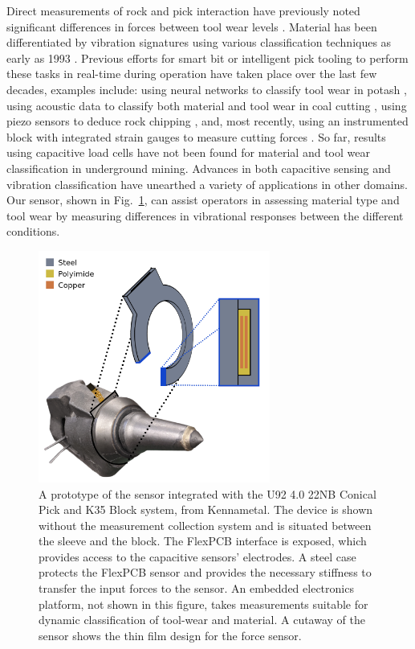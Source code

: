 Direct measurements of rock and pick interaction have previously noted 
 significant differences in forces between tool wear levels \cite{sundae85, donna90}.
Material has been differentiated by vibration signatures using various classification techniques
 as early as 1993 \cite{gary93}.
Previous efforts for smart bit or intelligent pick tooling to perform these tasks in real-time during operation 
 have taken place over the last few decades, examples include:
 using neural networks to classify tool wear in potash \cite{potashMeyersThesis}, 
 using acoustic data to classify both material and tool wear in coal cutting \cite{shen1996acoustic}, 
 using piezo sensors to deduce rock chipping \cite{smartbitMillerThesis},
 and, most recently, using an instrumented block with integrated strain gauges to measure cutting forces \cite{fries21}.
So far, results using capacitive load cells have not been found for 
 material and tool wear classification in underground mining. 
Advances in both capacitive sensing and vibration classification 
 have unearthed a variety of applications in other domains.
Our sensor, shown in Fig.~\ref{fig:senseonpick}, can assist operators in assessing material type and tool wear
 by measuring differences in vibrational responses between the different conditions.


\begin{figure}[t!]
\centering
\includegraphics[width=3in]{figures/p1_media/Fig1.png}
\caption{A prototype of the sensor integrated with the U92 4.0 22NB  Conical Pick
 and K35 Block system, from Kennametal. The device is shown without the measurement
 collection system and is situated between the sleeve and the block.
The FlexPCB interface is exposed, which provides access to the capacitive sensors' electrodes.
 A steel case protects the FlexPCB sensor and
provides the necessary stiffness to transfer the input forces to the sensor.
An embedded electronics platform, not shown in this figure, takes measurements
 suitable for dynamic classification of tool-wear and material. 
A cutaway of the sensor shows the thin film design for the force sensor.}
\label{fig:senseonpick}
\end{figure}


